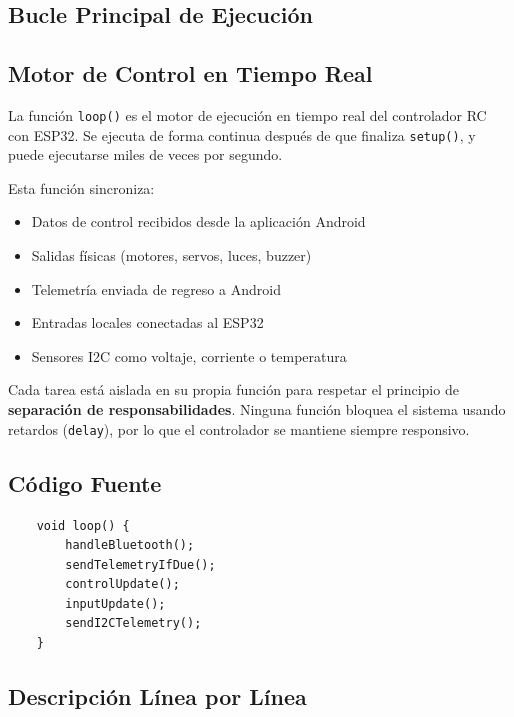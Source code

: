 \documentclass[12pt,a4paper]{article}
\newcommand{\ardfn}[1]{\texttt{\textcolor{arduinoOrange}{#1}}}
\begin{document}
\subsection{Bucle Principal de Ejecución}

\subsection*{Motor de Control en Tiempo Real}

La función \ardfn{loop}\texttt{()} es el motor de ejecución en tiempo real del
controlador RC con ESP32. Se ejecuta de forma continua después de que finaliza
\ardfn{setup}\texttt{()}, y puede ejecutarse miles de veces por segundo.

Esta función sincroniza:

\begin{itemize}
	\item Datos de control recibidos desde la aplicación Android
	\item Salidas físicas (motores, servos, luces, buzzer)
	\item Telemetría enviada de regreso a Android
	\item Entradas locales conectadas al ESP32
	\item Sensores I2C como voltaje, corriente o temperatura
\end{itemize}

Cada tarea está aislada en su propia función para respetar el principio de
\textbf{separación de responsabilidades}. Ninguna función bloquea el sistema
usando retardos (\texttt{delay}), por lo que el controlador se mantiene
siempre responsivo.

\subsection*{Código Fuente}

\begin{lstlisting}
	void loop() {
		handleBluetooth();
		sendTelemetryIfDue();
		controlUpdate();
		inputUpdate();
		sendI2CTelemetry();
	}
\end{lstlisting}

\subsection*{Descripción Línea por Línea}
\end{document}
